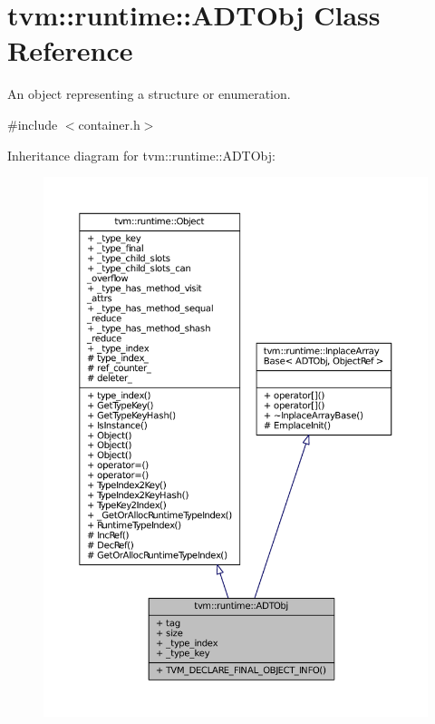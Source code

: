 \hypertarget{classtvm_1_1runtime_1_1ADTObj}{}\section{tvm\+:\+:runtime\+:\+:A\+D\+T\+Obj Class Reference}
\label{classtvm_1_1runtime_1_1ADTObj}


An object representing a structure or enumeration.  




{\ttfamily \#include $<$container.\+h$>$}



Inheritance diagram for tvm\+:\+:runtime\+:\+:A\+D\+T\+Obj\+:
\nopagebreak
\begin{figure}[H]
\begin{center}
\leavevmode
\includegraphics[width=350pt]{classtvm_1_1runtime_1_1ADTObj__inherit__graph}
\end{center}
\end{figure}


